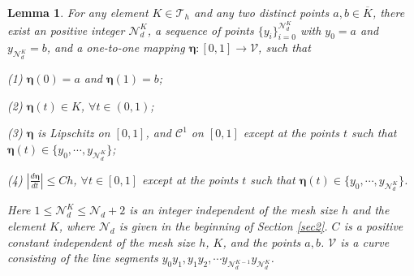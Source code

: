 \documentclass[1996/10/24]{amsart}
\newtheorem{lemma}[theorem]{Lemma}
\theoremstyle{definition}
\numberwithin{equation}{section}
\begin{document}
\begin{lemma}\label{curve-assumption}
For any element $K\in\mathcal{T}_h$ and any two distinct points $a,b\in \overline{K}$, there exist an positive integer $\mathcal{N}_d^K$, a sequence of points $\{y_i\}_{i=0}^{\mathcal{N}_d^K}$ with
$y_0=a$ and $y_{\mathcal{N}_d^K}=b$, and a one-to-one mapping $\boldsymbol{\eta}:[0,1]\rightarrow \mathcal{V}$, such that

(1) $\boldsymbol{\eta}\left(0\right)=a$ and $\boldsymbol{\eta}\left(1\right)=b$;

(2) $\boldsymbol{\eta}(t)\in K$, $\forall t\in(0,1)$;

(3) $\boldsymbol{\eta}$ is Lipschitz on $[0,1]$, and $\mathcal{C}^1$ on $[0,1]$ except at the points $t$ such that $\boldsymbol{\eta}(t)\in \{y_0,\cdots,y_{\mathcal{N}_d^K}\}$;

(4) $\left|\frac{d\boldsymbol{\eta}}{dt}\right|\leq Ch$, $\forall t\in [0,1]$ except at the points $t$ such that $\boldsymbol{\eta}(t)\in \{y_0,\cdots,y_{\mathcal{N}_d^K}\}$.

\noindent Here $1\leq\mathcal{N}_d^K\leq \mathcal{N}_d+2$ is an integer independent of the mesh size $h$ and the element $K$, where $\mathcal{N}_d$ is given in the beginning of Section \ref{sec2}. $C$ is a positive constant independent of the mesh size $h$, $K$, and the points $a,b$. $\mathcal{V}$ is a curve consisting of the line segments $y_0y_1, y_1y_2,\cdots y_{\mathcal{N}_d^{K-1}}y_{\mathcal{N}_d^K}$.
\end{lemma}
\end{document}
